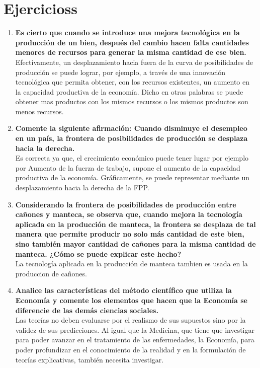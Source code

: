 \documentclass[12pt]{book}
\begin{document}
\section{Ejercicioss}
\begin{enumerate}
\item \textbf{Es cierto que cuando se introduce una mejora tecnológica en la producción de un bien, después del cambio hacen falta cantidades menores de recursos para generar la misma cantidad de ese bien.}
\\
Efectivamente, un desplazamiento hacia fuera de la curva de posibilidades de producción se puede lograr, por ejemplo, a través de una innovación tecnológica que permita obtener, con los recursos existentes, un aumento en la capacidad productiva de la economía. Dicho en otras palabras se puede obtener mas productos con los mismos recursos o los mismos productos son menos recursos.

\item \textbf{Comente la siguiente afirmación: Cuando disminuye el desempleo en un país, la frontera de posibilidades de producción se desplaza hacia la derecha.}
\\
Es correcta ya que, el crecimiento económico puede tener lugar por ejemplo por Aumento de la fuerza de trabajo, supone el aumento
de la capacidad productiva de la economía. Gráficamente, se puede representar mediante un desplazamiento hacia la derecha de la FPP.

\item \textbf{Considerando la frontera de posibilidades de producción entre cañones y manteca, se observa que, cuando mejora la tecnología aplicada en la producción de manteca, la frontera se desplaza de tal manera que permite producir no solo más cantidad
de este bien, sino también mayor cantidad de cañones para la misma cantidad de manteca. ¿Cómo se puede explicar este hecho?}
\\
La tecnología aplicada en la producción de manteca tambien es usada en la produccion de cañones.

\item \textbf{Analice las características del método científico que utiliza la Economía y comente los elementos que hacen que la Economía se diferencie de las demás ciencias sociales.}
\\
Las teorías no deben evaluarse por el realismo de sus supuestos sino por la validez de sus predicciones.
Al igual que la Medicina, que tiene que investigar para poder avanzar en el tratamiento de las enfermedades, la Economía, para poder profundizar en el conocimiento de la realidad y en la formulación de teorías explicativas, también necesita investigar.


\end{enumerate}
\end{document}
